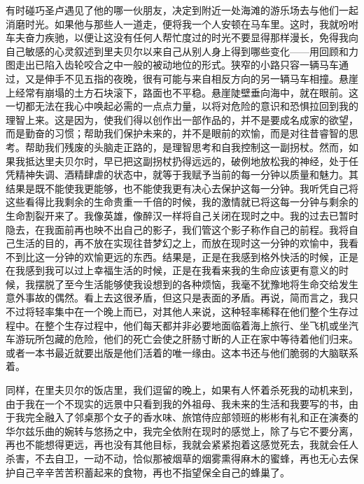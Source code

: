 \par 有时碰巧圣卢遇见了他的哪一伙朋友，决定到附近一处海滩的游乐场去与他们一起消磨时光。如果他与那些人一道走，便将我一个人安顿在马车里。这时，我就吩咐车夫奋力疾驰，以便让这没有任何人帮忙度过的时光不要显得那样漫长，免得我向自己敏感的心灵叙述到里夫贝尔以来自己从别人身上得到哪些变化——用回顾和力图走出已陷入齿轮咬合之中一般的被动地位的形式。狭窄的小路只容一辆马车通过，又是伸手不见五指的夜晚，很有可能与来自相反方向的另一辆马车相撞。悬崖上经常有崩塌的土方石块滚下，路面也不平稳。悬崖陡壁垂向海中，就在眼前。这一切都无法在我心中唤起必需的一点点力量，以将对危险的意识和恐惧拉回到我的理智上来。这是因为，使我们得以创作出一部作品的，并不是要成名成家的欲望，而是勤奋的习惯；帮助我们保护未来的，并不是眼前的欢愉，而是对往昔睿智的思考。帮助我们残废的头脑走正路的，是理智思考和自我控制这一副拐杖。然而，如果我抵达里夫贝尔时，早已把这副拐杖扔得远远的，破例地放松我的神经，处于任凭精神失调、酒精肆虐的状态中，就等于我赋予当前的每一分钟以质量和魅力。其结果是既不能使我更能够，也不能使我更有决心去保护这每一分钟。我听凭自己将这些看得比我剩余的生命贵重一千倍的时候，我的激情就已将这每一分钟与剩余的生命割裂开来了。我像英雄，像醉汉一样将自己关闭在现时之中。我的过去已暂时隐去，在我面前再也映不出自己的影子，我们管这个影子称作自己的前程。我将自己生活的目的，再不放在实现往昔梦幻之上，而放在现时这一分钟的欢愉中，我看不到比这一分钟的欢愉更远的东西。结果是，正是在我感到格外快活的时候，正是在我感到我可以过上幸福生活的时候，正是在我看来我的生命应该更有意义的时候，我摆脱了至今生活能够使我设想到的各种烦恼，我毫不犹豫地将生命交给发生意外事故的偶然。看上去这很矛盾，但这只是表面的矛盾。再说，简而言之，我只不过将轻率集中在一个晚上而已，对其他人来说，这种轻率稀释在他们整个生存过程中。在整个生存过程中，他们每天都并非必要地面临着海上旅行、坐飞机或坐汽车游玩所包藏的危险，他们的死亡会使之肝肠寸断的人正在家中等待着他们归来。或者一本书最近就要出版是他们活着的唯一缘由。这本书还与他们脆弱的大脑联系着。
\par 同样，在里夫贝尔的饭店里，我们逗留的晚上，如果有人怀着杀死我的动机来到，由于我在一个不现实的远景中只看到我的外祖母、我未来的生活和我要写的书，由于我完全融入了邻桌那个女子的香水味、旅馆侍应部领班的彬彬有礼和正在演奏的华尔兹乐曲的婉转与悠扬之中，我完全依附在现时的感觉上，除了与它不要分离，再也不能想得更远，再也没有其他目标，我就会紧紧抱着这感觉死去，我就会任人杀害，不去自卫，一动不动，恰似那被烟草的烟雾熏得麻木的蜜蜂，再也无心去保护自己辛辛苦苦积蓄起来的食物，再也不指望保全自己的蜂巢了。
